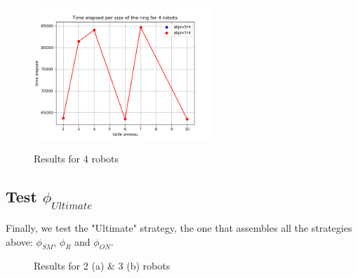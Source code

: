 \documentclass{article}
\begin{document}
\begin{figure}[!h]
    \centering
    \includegraphics[width=0.6\textwidth]{../data/data-phiR24/compar_phiR24_4.png}\label{phiR24r4}
    \caption{Results for 4 robots}
\end{figure}

\FloatBarrier

\subsection{Test $\phi_{Ultimate}$}

Finally, we test the "Ultimate" strategy, the one that assembles all the strategies above: $\phi_{SM}$, $\phi_{R}$ and $\phi_{ON}$.

\begin{figure}[!ht]
    \centering
    \caption{Results for 2  (a) \& 3  (b) robots}
\end{figure}
\end{document}
